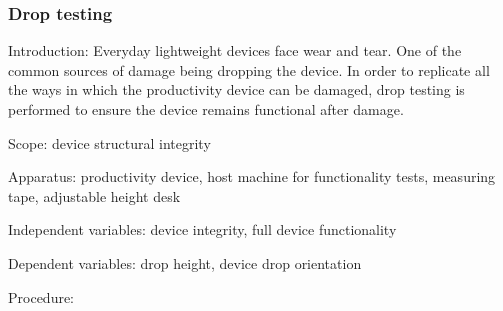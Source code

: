 \subsubsection{Drop testing}\label{drop-testing}

Introduction: Everyday lightweight devices face wear and tear. One of
the common sources of damage being dropping the device. In order to
replicate all the ways in which the productivity device can be damaged,
drop testing is performed to ensure the device remains functional after
damage.

Scope: device structural integrity

Apparatus: productivity device, host machine for functionality tests,
measuring tape, adjustable height desk

Independent variables: device integrity, full device functionality

Dependent variables: drop height, device drop orientation

Procedure:

